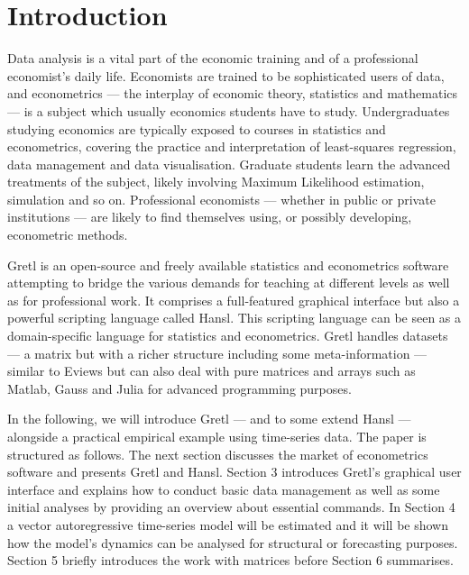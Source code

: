 \documentclass[11pt]{article}
\begin{document}
\vfill

\newpage
\doublespacing

\newpage
\section{Introduction}
\label{sec:intro}
Data analysis is a vital part of the economic training and of a professional economist's daily life. Economists are trained to be sophisticated users of data, and econometrics --- the interplay of economic theory, statistics and mathematics --- is a subject which usually economics students have to study. %
Undergraduates studying economics are typically exposed to courses in statistics and econometrics, covering the practice and interpretation of least-squares regression, data management and data visualisation. Graduate students learn the advanced treatments of the subject, likely involving Maximum Likelihood estimation, simulation and so on. Professional economists --- whether in public or private institutions --- are likely to find themselves using, or possibly developing, econometric methods.

Gretl is an open-source and freely available statistics and econometrics software attempting to bridge the various demands for teaching at different levels as well as for professional work. It comprises a full-featured graphical interface but also a powerful scripting language called Hansl. This scripting language can be seen as a domain-specific language for statistics and econometrics. Gretl handles datasets --- a matrix but with a richer structure including some meta-information %
--- similar to Eviews but can also deal with pure matrices and arrays such as Matlab, Gauss and Julia for advanced programming purposes.

In the following, we will introduce Gretl --- and to some extend Hansl --- alongside a practical empirical example using time-series data. %
The paper is structured as follows. The next section discusses the market of econometrics software and presents Gretl and Hansl. Section 3 introduces Gretl's graphical user interface and explains how to conduct basic data management as well as some initial analyses by providing an overview about essential commands. In Section 4 a vector autoregressive time-series model will be estimated and it will be shown how the model's dynamics can be analysed for structural or forecasting purposes. Section 5 briefly introduces the work with matrices before Section 6 summarises.
\end{document}
